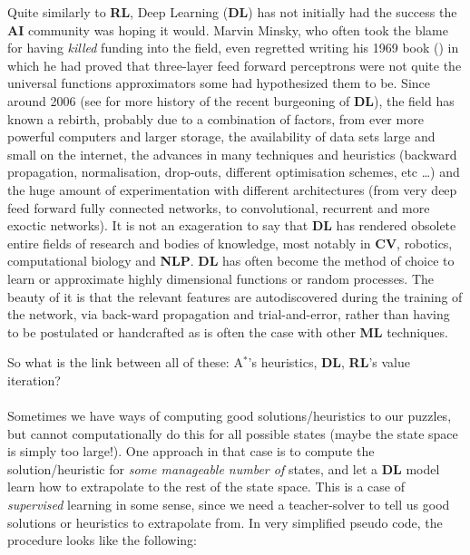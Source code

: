 Quite similarly to \textbf{RL}, Deep Learning (\textbf{DL}) has not initially had the success the \textbf{AI} community was hoping it would. Marvin Minsky, who often took the blame for having \textit{killed} funding into the field, even regretted writing his 1969 book (\cite{minskypapert69}) in which he had proved that three-layer feed forward perceptrons were not quite the universal functions approximators some had hypothesized them to be. Since around 2006 (see \cite{GoodBengCour16} for more history of the recent burgeoning of \textbf{DL}), the field has known a rebirth, probably due to a combination of factors, from ever more powerful computers and larger storage, the availability of data sets large and small on the internet, the advances in many techniques and heuristics (backward propagation, normalisation, drop-outs, different optimisation schemes, etc \dots) and the huge amount of experimentation with different architectures (from very deep feed forward fully connected networks, to convolutional, recurrent and more exoctic networks). It is not an exageration to say that \textbf{DL} has rendered obsolete entire fields of research and bodies of knowledge, most notably in \textbf{CV}, robotics, computational biology and \textbf{NLP}. \textbf{DL} has often become the method of choice to learn or approximate highly dimensional functions or random processes. The beauty of it is that the relevant features are autodiscovered during the training of the network, via back-ward propagation and trial-and-error, rather than having to be postulated or handcrafted as is often the case with other \textbf{ML} techniques.


\label{sec:TheoryDLDRL}
So what is the link between all of these: A$^{*}$'s heuristics, \textbf{DL}, \textbf{RL}'s value iteration?
\\
\\
Sometimes we have ways of computing good solutions/heuristics to our puzzles, but cannot computationally do this for all possible states (maybe the state space is simply too large!). One approach in that case is to compute the solution/heuristic for \textit{some manageable number of} states, and let a \textbf{DL} model learn how to extrapolate to the rest of the state space. This is a case of \textit{supervised} learning in some sense, since we need a teacher-solver to tell us good solutions or heuristics to extrapolate from. In very simplified pseudo code, the procedure looks like the following:

